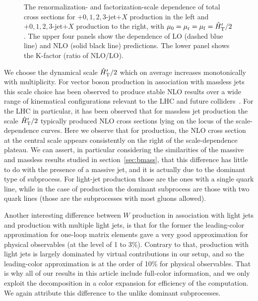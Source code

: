 \begin{figure}[ht]
\begin{center}
\end{center}
\caption{The renormalization- and factorization-scale dependence of total cross
  sections for \Wbbm$+0,1,2,3$-jet$+X$ production in the left and
\Wbbp$+0,1,2,3$-jet$+X$ production to the right,
 with $\mu_0=\mu_\mathrm{r}=\mu_\mathrm{f}={\hat H}_{\mathrm T}'/2$. 
The upper four panels show the dependence of LO (dashed blue line) and
  NLO (solid black line) predictions. The lower panel shows
  the K-factor (ratio of NLO/LO).}
\label{fig_Wjets_sdep}
\end{figure}

We choose the dynamical scale ${\hat H}_{\mathrm T}'/2$ which on average increases monotonically with multiplicity. For vector boson production in association with massless jets this scale choice
has been observed to produce stable NLO results over a wide range of kinematical
configurations relevant to the LHC and future
colliders~\cite{BH:W3jPRL,BH:W4j,BH:W5j,Mangano:2016jyj}. For the LHC in
particular, it has been observed that for massless jet production the scale
${\hat H}_{\mathrm T}'/2$ typically produced NLO cross sections lying on the locus of the
scale-dependence curves. Here we observe that for \Wbbn{} production, the
NLO cross section at the central scale appears consistently on the right of the
scale-dependence plateau. We can assert, in particular considering the
similarities of the massive and massless results studied in
section~\ref{sec:bmass}, that this difference has little to do with the presence
of a massive jet, and it is actually due to the dominant type of subprocess. For
light-jet production those are the ones with a single quark line, while in
the case of \Wbbn{} production the dominant subprocess are those with
two quark lines (those are the subprocesses with most gluons allowed).

Another interesting difference between $W$ production in association with light
jets and \Wbb{} production with multiple light jets, is that for the
former the leading-color approximation for one-loop matrix elements gave a very good
approximation for physical observables (at the level of 1 to
3\%). Contrary to that, \Wbb{} production with light jets is largely dominated by virtual
contributions in our setup, and so the leading-color approximation is at the
order of 10\% for physical observables. That is why all of our results in this
article include full-color information, and we only
exploit the decomposition in a color expansion for efficiency of the
computation. We again attribute this difference to the unlike dominant
subprocesses.


